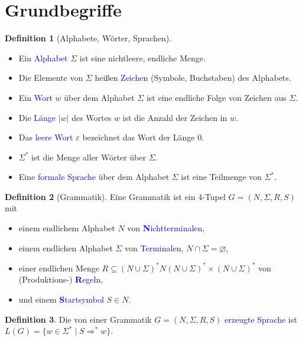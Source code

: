 \documentclass{scrreprt}
\theoremstyle{definition}
\newtheorem{Definition}{Definition}[section]
\theoremstyle{example}
\theoremstyle{algorithm}
\begin{document}
\section{Grundbegriffe}
\begin{Definition}[Alphabete, Wörter, Sprachen]
\noindent
\begin{itemize}
\item
Ein \textcolor{blue}{Alphabet} $\Sigma$ ist eine nichtleere, endliche Menge.
\item
Die Elemente von $\Sigma$ heißen \textcolor{blue}{Zeichen} (Symbole, Buchstaben) des Alphabets.
\item
Ein \textcolor{blue}{Wort} $w$ über dem Alphabet $\Sigma$ ist eine endliche Folge von Zeichen aus $\Sigma$.
\item
Die \textcolor{blue}{Länge} $|w|$ des Wortes $w$ ist die Anzahl der Zeichen in $w$.
\item
Das \textcolor{blue}{leere Wort} $\varepsilon$ bezeichnet das Wort der Länge $0$.
\item
$\Sigma^*$ ist die Menge aller Wörter über $\Sigma$.
\item
Eine \textcolor{blue}{formale Sprache} über dem Alphabet $\Sigma$ ist eine Teilmenge von $\Sigma^*$.
\end{itemize}
\end{Definition}

\begin{Definition}[Grammatik]
Eine Grammatik ist ein 4-Tupel $G=(N,\Sigma,R,S)$ mit
\noindent
\begin{itemize}
\item
einem endlichem Alphabet $N$ von \textcolor{blue}{\textbf{N}ichtterminalen},
\item
einem endlichen Alphabet $\Sigma$ von \textcolor{blue}{Terminalen}, $N\cap \Sigma = \varnothing$,
\item
einer endlichen Menge $R \subseteq (N \cup \Sigma)^* N (N \cup \Sigma)^* \times (N \cup \Sigma)^*$ von (Produktions-) \textcolor{blue}{\textbf{R}egeln},
\item
und einem \textcolor{blue}{\textbf{S}tartsymbol} $S\in N$.
\end{itemize}
\end{Definition}

\begin{Definition}
Die von einer Grammatik $G=(N,\Sigma,R,S)$ \textcolor{blue}{erzeugte Sprache} ist $L(G)=\{w\in \Sigma^* \mid S \Rightarrow^* w\}$.
\end{Definition}
\end{document}
